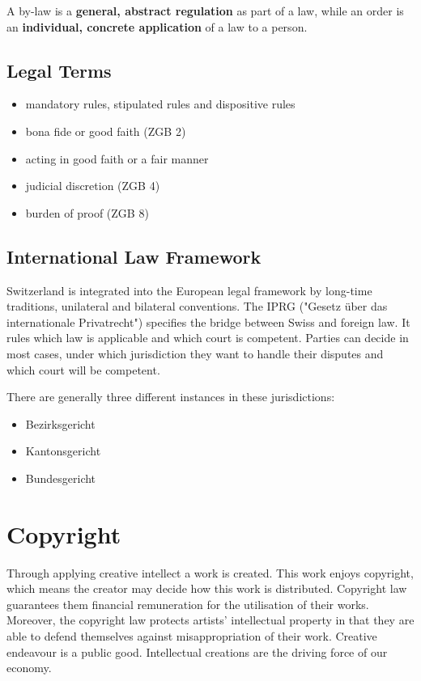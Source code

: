 \documentclass[11pt]{article}
\theoremstyle{definition}
\begin{document}
A by-law is a \textbf{general, abstract regulation} as part of a law, while an order is an \textbf{individual, concrete application} of a law to a person.

\subsection{Legal Terms}
\begin{itemize}
	\item mandatory rules, stipulated rules and dispositive rules
	\item bona fide or good faith (ZGB 2)
	\item acting in good faith or a fair manner
	\item judicial discretion (ZGB 4)
	\item burden of proof (ZGB 8)
\end{itemize}

\subsection{International Law Framework}
Switzerland is integrated into the European legal framework by long-time traditions, unilateral and bilateral conventions. The IPRG ("Gesetz über das internationale Privatrecht") specifies the bridge between Swiss and foreign law. It rules which law is applicable and which court is competent. Parties can decide in most cases, under which jurisdiction they want to handle their disputes and which court will be competent.

There are generally three different instances in these jurisdictions:
\begin{itemize}
	\item Bezirksgericht
	\item Kantonsgericht
	\item Bundesgericht
\end{itemize}

\section{Copyright}
Through applying creative intellect a work is created. This work enjoys copyright, which means the creator may decide how this work is distributed. Copyright law guarantees them financial remuneration for the utilisation of their works. Moreover, the copyright law protects artists’ intellectual property in that they are able to defend themselves against
misappropriation of their work. Creative endeavour is a public good. Intellectual creations are the driving force of our economy.
\end{document}
